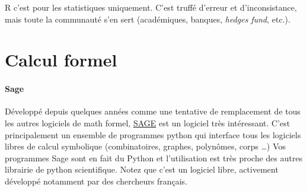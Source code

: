 
R c'est pour les statistiques uniquement. C'est truffé d'erreur et d'inconsistance, mais
toute la communauté s'en sert (académiques, banques, \textit{hedges fund}, etc.).

\section{Calcul formel}


\paragraph{Sage}

Développé depuis quelques années comme une tentative de remplacement de tous les
autres logiciels de math formel,  \href{http://www.sagemath.org/}{SAGE} est un logiciel très intéressant.
C'est principalement un ensemble de programmes python qui interface tous les logiciels
libres de calcul symbolique (combinatoires, graphes, polynômes, corps \dots)
Vos programmes Sage sont en fait du Python et l'utilisation est très proche des 
autres librairie de python scientifique.
Notez que c'est un logiciel libre, activement développé notamment par des chercheurs français.



